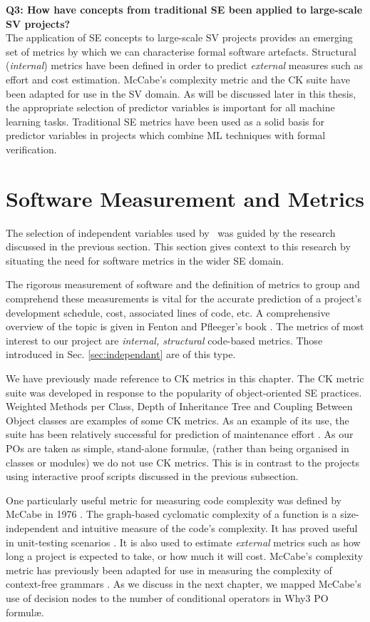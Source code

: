 \textbf{Q3: How have concepts from traditional SE been applied to large-scale SV projects?} \\
The application of SE concepts to large-scale SV projects provides an emerging set of metrics by which we can characterise formal software artefacts.   
Structural (\textit{internal}) metrics have been defined in order to predict \textit{external} measures such as effort and cost estimation. 
McCabe's complexity metric and the CK suite have been adapted for use in the SV domain.
As will be discussed later in this thesis, the appropriate selection of predictor variables is important for all machine learning tasks. 
Traditional SE metrics have been used as a solid basis for predictor variables in projects which combine ML techniques with formal verification.
       
\section{Software Measurement and Metrics}
\label{sec:lrmm}

The selection of independent variables used by \where~was guided by the research discussed in the previous section. 
This section gives context to this research by situating the need for software metrics in the wider SE domain.

The rigorous measurement of software and the definition of metrics to group and comprehend these measurements is vital for the accurate prediction of a project's development schedule, cost, associated lines of code, etc. 
A comprehensive overview of the topic is given in Fenton and Pfleeger's book \cite{FentonPfleeger}. 
The metrics of most interest to our project are \textit{internal, structural} code-based metrics. 
Those introduced in Sec. \ref{sec:independant} are of this type.

We have previously made reference to CK metrics in this chapter. 
The CK metric suite was developed in response to the popularity of object-oriented SE practices. 
Weighted Methods per Class, Depth of Inheritance Tree and Coupling Between Object classes are examples of some CK metrics. 
As an example of its use, the suite has been relatively successful for prediction of maintenance effort \cite{LiHenry}. 
As our POs are taken as simple, stand-alone formul\ae, (rather than being organised in classes or modules) we do not use CK metrics. 
This is in contrast to the projects using interactive proof scripts discussed in the previous subsection. 

One particularly useful metric for measuring code complexity was defined by McCabe in 1976 \cite{McCabe}. The graph-based cyclomatic complexity of a function is a size-independent and intuitive measure of the code's complexity. It has proved useful in unit-testing scenarios \cite{McCabeTesting}. It is also used to estimate \textit{external} metrics such as how long a project is expected to take, or how much it will cost.  McCabe's complexity metric has previously been adapted for use in measuring the complexity of context-free grammars \cite{nuimeprn6458}. As we discuss in the next chapter, we mapped McCabe's use of decision nodes to the number of conditional operators in \textsf{Why3} PO formul\ae.

